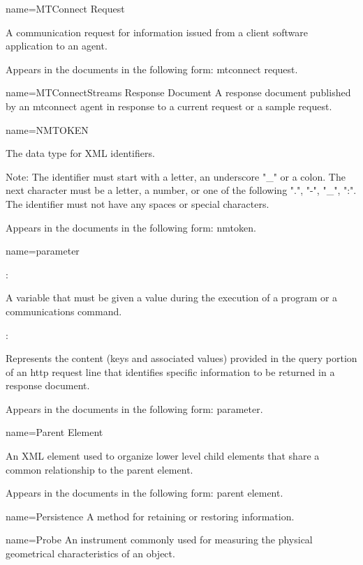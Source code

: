 {
  name={MTConnect Request}
}
{
	A communication request for information issued from a client software application to an \gls{agent}.

	Appears in the documents in the following form: \gls{mtconnect request}.
}


{
  name={MTConnectStreams Response Document}
}
{
	A \gls{response document} published by an \gls{mtconnect agent} in response to a \gls{current request} or a \gls{sample request}.
}


{
  name={\normalfont NMTOKEN}
}
{
	The data type for XML identifiers.

	\begin{note}
	Note: The identifier must start with a letter, an underscore "\_" or a colon.  The next character must be a letter, a number, or one of the following ".", "-", "\_", ":".  The identifier must not have any spaces or special characters.
	\end{note}

	Appears in the documents in the following form: \gls{nmtoken}.
}


{
  name={parameter}
}
{
	:

	A variable that must be given a value during the execution of a program or a communications command.

	:

	Represents the content (keys and associated values) provided in the \gls{query} portion of an \gls{http request line} that identifies specific information to be returned in a \gls{response document}.

	Appears in the documents in the following form: parameter.
}


{
  name={Parent Element}
}
{
	An XML element used to organize \gls{lower level} child elements that share a common relationship to the \gls{parent element}.

	Appears in the documents in the following form: \gls{parent element}.
}


{
  name={Persistence}
}
{
	A method for retaining or restoring information.
}


{
  name={Probe}
}
{
	An instrument commonly used for measuring the physical geometrical characteristics of an object.
}



